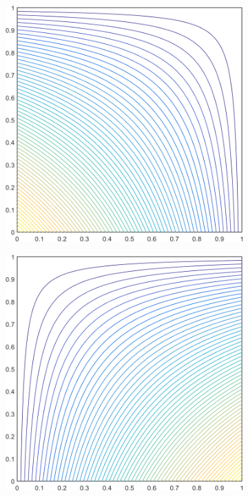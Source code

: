 \begin{figure}
\begin{subfigure}[b]{0.39\textwidth}
		\caption{}
	\end{subfigure}
	\vfill
	\begin{subfigure}[b]{0.39\textwidth}
		\centering
		\includegraphics[width=\textwidth]{figures/sec_BF/square_MAXENT1_contour_b1.png}
		\caption{}
	\end{subfigure}
	\hspace{1.5cm}
	\begin{subfigure}[b]{0.39\textwidth}
		\centering
		\includegraphics[width=\textwidth]{figures/sec_BF/square_MAXENT1_contour_b2.png}

\end{subfigure}
\end{figure}
